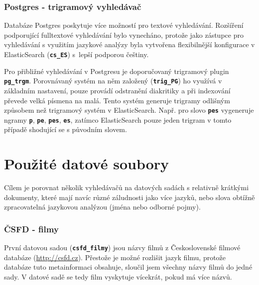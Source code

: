\documentclass[11pt,letterpaper,oneside,openright]{book}
\newcommand{\bftt}[1]{\texttt{\textbf{#1}}}
\begin{document}
\subsubsection{Postgres - trigramový vyhledávač}
Databáze Postgres poskytuje více možností pro textové vyhledávání. Rozšíření
podporující fulltextové vyhledávání bylo vynecháno, protože jako zástupce pro
vyhledávání s využitím jazykové analýzy byla vytvořena flexibilnější
konfigurace v ElasticSearch (\bftt{cs\_ES}) s~lepší podporou češtiny.

Pro přibližné vyhledávání v Postgresu je doporučovaný trigramový plugin
\bftt{pg\_trgm}. Porovnávaný systém na něm založený (\bftt{trig\_PG}) ho
využívá v základním nastavení, pouze provádí odstranění diakritiky a při
indexování převede velká písmena na malá. Tento systém generuje trigramy
odlišným způsobem než trigramový systém v ElasticSearch. Např. pro slovo
\bftt{pes} vygeneruje ngramy \bftt{p}, \bftt{pe}, \bftt{pes}, \bftt{es},
zatímco ElasticSearch pouze jeden trigram v tomto případě shodující se s
původním slovem.





\section{Použité datové soubory}
Cílem je porovnat několik vyhledávačů na datových sadách s relativně krátkými
dokumenty, které mají navíc různé záludnosti jako více jazyků, nebo slova
obtížně zpracovatelná jazykovou analýzou (jména nebo odborné pojmy).

\subsubsection{ČSFD - filmy}
První datovou sadou (\bftt{csfd\_filmy}) jsou názvy filmů z Československé
filmové databáze (\url{http://csfd.cz}). Přestože je možné rozlišit jazyk
filmu, protože databáze tuto metainformaci obsahuje, sloučil jsem všechny názvy
filmů do jedné sady. V datové sadě se tedy film vyskytuje vícekrát, pokud má
více názvů.
\end{document}
